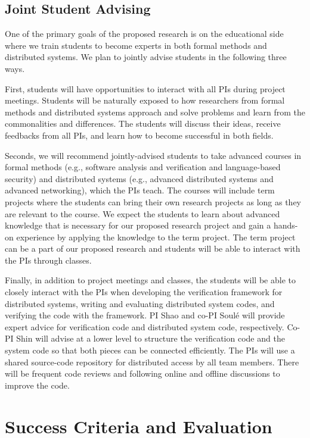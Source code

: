 \documentclass[11pt]{article}
\begin{document}
\subsection{Joint Student Advising}

One of the primary goals of the proposed research is on the educational
side where we train students to become experts in both formal
methods and distributed systems. We plan to jointly advise students
in the following three ways. 

First, students will have opportunities to interact with all PIs during
project meetings. Students will be naturally exposed to how 
researchers from formal methods and distributed systems approach and 
solve problems and learn from the commonalities and differences. The students
will discuss their ideas, receive feedbacks from all PIs, and learn how to 
become successful in both fields. 

Seconds, we will recommend jointly-advised students to take advanced
courses in formal methods (e.g., software analysis and verification
and language-based security) and distributed systems (e.g., advanced
distributed systems and advanced networking), which the PIs teach. The
courses will include term projects where the students can bring their
own research projects as long as they are relevant to the course.  We
expect the students to learn about advanced knowledge that is
necessary for our proposed research project and gain a hands-on
experience by applying the knowledge to the term project. The term
project can be a part of our proposed research and students will be
able to interact with the PIs through classes.

Finally, in addition to project meetings and classes, the students
will be able to closely interact with the PIs when developing the
verification framework for distributed systems, writing and evaluating
distributed system codes, and verifying the code with the
framework. PI Shao and co-PI Soul\'e will provide expert advice for
verification code and distributed system code, respectively. Co-PI
Shin will advise at a lower level to structure the verification code
and the system code so that both pieces can be connected efficiently.
The PIs will use a shared source-code repository for distributed
access by all team members. There will be frequent code reviews and
following online and offline discussions to improve the code.

\section{Success Criteria and Evaluation}
\end{document}
